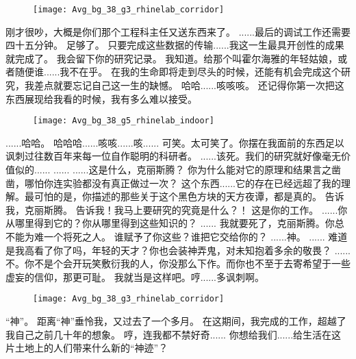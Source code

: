\documentclass[openany]{book}
\begin{document}
\begin{figure}[h]
    \centering
    \texttt{[image: Avg\_bg\_38\_g3\_rhinelab\_corridor]}
\end{figure}
\begin{dialogue}
     刚才很吵，大概是你们那个工程科主任又送东西来了。
     ......最后的调试工作还需要四十五分钟。
     足够了。
     只要完成这些数据的传输......我这一生最具开创性的成果就完成了。
     我会留下你的研究记录。
     我知道。给那个叫霍尔海雅的年轻姑娘，或者随便谁......我不在乎。
     在我的生命即将走到尽头的时候，还能有机会完成这个研究，我差点就要忘记自己这一生的缺憾。
     哈哈......咳咳咳。
     还记得你第一次把这东西展现给我看的时候，我有多么难以接受。
    \begin{figure}[h]
        \centering
        \texttt{[image: Avg\_bg\_38\_g5\_rhinelab\_indoor]}
    \end{figure}
     ......哈哈。
     哈哈哈......咳咳......咳......
     可笑。太可笑了。你摆在我面前的东西足以讽刺过往数百年来每一位自作聪明的科研者。
     ......该死。我们的研究就好像毫无价值似的......
     ......
     ......这是什么，克丽斯腾？
     你为什么能对它的原理和结果言之凿凿，哪怕你连实验都没有真正做过一次？
     这个东西......它的存在已经远超了我的理解。最可怕的是，你描述的那些关于这个黑色方块的天方夜谭，都是真的。
     告诉我，克丽斯腾。
     告诉我！我马上要研究的究竟是什么？！
     这是你的工作。
     ......你从哪里得到它的？你从哪里得到这些知识的？
     ......
     我就要死了，克丽斯腾。你总不能为难一个将死之人。
     谁赋予了你这些？谁把它交给你的？
     ......神。
     ......
     难道是我高看了你了吗，年轻的天才？你也会装神弄鬼，对未知抱着多余的敬畏？
     ......不。你不是个会开玩笑敷衍我的人，你没那么下作。而你也不至于去寄希望于一些虚妄的信仰，那更可耻。
     我就当是这样吧。哼......多讽刺啊。
    \begin{figure}[h]
        \centering
        \texttt{[image: Avg\_bg\_38\_g3\_rhinelab\_corridor]}
    \end{figure}
     “神”。
     距离“神”垂怜我，又过去了一个多月。
     在这期间，我完成的工作，超越了我自己之前几十年的想象。
     哼，连我都不禁好奇......
     你想给我们......给生活在这片土地上的人们带来什么新的“神迹”？
\end{dialogue}
\end{document}
